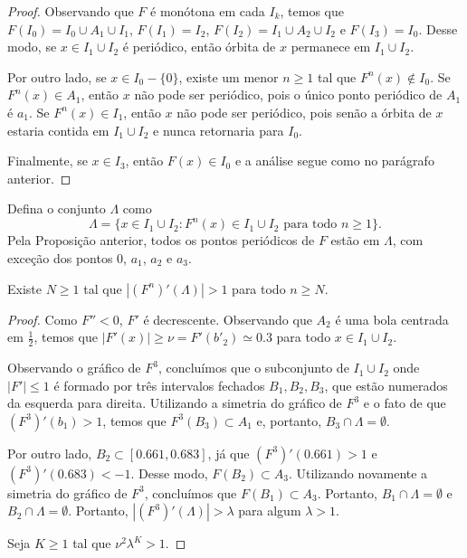 \begin{proof}
Observando que $F$ é monótona em cada $I_k$, temos que $F(I_0) = I_0 \cup A_1 \cup I_1$, $F(I_1) = I_2$, $F(I_2) = I_1 \cup A_2 \cup I_2$ e $F(I_3) = I_0$. Desse modo, se $x \in I_1 \cup I_2$ é periódico, então órbita de $x$ permanece em $I_1 \cup I_2$.

Por outro lado, se $x \in I_0 - \{ 0 \}$, existe um menor $n \geq 1$ tal que $F^n(x) \notin I_0$. Se $F^n(x) \in A_1$, então $x$ não pode ser periódico, pois o único ponto periódico de $A_1$ é $a_1$. Se $F^n(x) \in I_1$, então $x$ não pode ser periódico, pois senão a órbita de $x$ estaria contida em $I_1 \cup I_2$ e nunca retornaria para $I_0$.

Finalmente, se $x \in I_3$, então $F(x) \in I_0$ e a análise segue como no parágrafo anterior.
\end{proof}

Defina o conjunto $\Lambda$ como
$$\Lambda = \{ x \in I_1 \cup I_2 : F^n(x) \in I_1 \cup I_2 \textrm{ para todo } n \geq 1 \}.$$
Pela Proposição anterior, todos os pontos periódicos de $F$ estão em $\Lambda$, com exceção dos pontos $0$, $a_1$, $a_2$ e $a_3$.


\begin{lemma}
Existe $N \geq 1$ tal que $|(F^n)'(\Lambda)| > 1$ para todo $n \geq N$.
\end{lemma}


\begin{proof}
Como $F'' < 0$, $F'$ é decrescente. Observando que $A_2$ é uma bola centrada em $\frac{1}{2}$, temos que $|F'(x)| \geq \nu = F'(b'_2) \simeq 0.3$ para todo $x \in I_1 \cup I_2$.

Observando o gráfico de $F^3$, concluímos que o subconjunto de $I_1 \cup I_2$ onde $|F'| \leq 1$ é formado por três intervalos fechados $B_1, B_2, B_3$, que estão numerados da esquerda para direita. Utilizando a simetria do gráfico de $F^3$ e o fato de que $(F^3)'(b_1) > 1$, temos que $F^3(B_3) \subset A_1$ e, portanto, $B_3 \cap \Lambda = \emptyset$.

Por outro lado, $B_2 \subset [0.661, 0.683]$, já que $(F^3)'(0.661) > 1$ e $(F^3)'(0.683) < -1$. Desse modo, $F(B_2) \subset A_3$. Utilizando novamente a simetria do gráfico de $F^3$, concluímos que $F(B_1) \subset A_3$. Portanto, $B_1 \cap \Lambda = \emptyset$ e $B_2 \cap \Lambda = \emptyset$. Portanto, $|(F^3)'(\Lambda)| > \lambda$ para algum $\lambda > 1$.

Seja $K \geq 1$ tal que $\nu^2 \lambda^K > 1$. 


\end{proof}


